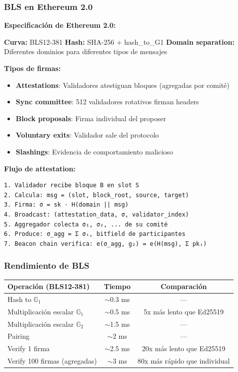 \documentclass[11pt,a4paper,twoside,openright]{book}
\theoremstyle{definition}
\theoremstyle{plain}
\theoremstyle{remark}
\newcommand{\G}{\mathbb{G}}
\begin{document}
\subsubsection{BLS en Ethereum 2.0}

\begin{mathnote}
\textbf{Especificación de Ethereum 2.0:}

\textbf{Curva:} BLS12-381
\textbf{Hash:} SHA-256 + hash\_to\_G1
\textbf{Domain separation:} Diferentes dominios para diferentes tipos de mensajes

\textbf{Tipos de firmas:}
\begin{itemize}
    \item \textbf{Attestations}: Validadores atestiguan bloques (agregadas por comité)
    \item \textbf{Sync committee}: 512 validadores rotativos firman headers
    \item \textbf{Block proposals}: Firma individual del proposer
    \item \textbf{Voluntary exits}: Validador sale del protocolo
    \item \textbf{Slashings}: Evidencia de comportamiento malicioso
\end{itemize}

\textbf{Flujo de attestation:}
\begin{verbatim}
1. Validador recibe bloque B en slot S
2. Calcula: msg = (slot, block_root, source, target)
3. Firma: σ = sk · H(domain || msg)
4. Broadcast: (attestation_data, σ, validator_index)
5. Aggregador colecta σ₁, σ₂, ... de su comité
6. Produce: σ_agg = Σ σᵢ, bitfield de participantes
7. Beacon chain verifica: e(σ_agg, g₂) = e(H(msg), Σ pkᵢ)
\end{verbatim}
\end{mathnote}

\subsubsection{Rendimiento de BLS}

\begin{center}
\begin{tabular}{lcc}
\toprule
\textbf{Operación (BLS12-381)} & \textbf{Tiempo} & \textbf{Comparación} \\
\midrule
Hash to $\G_1$ & $\sim$0.3 ms & --- \\
Multiplicación escalar $\G_1$ & $\sim$0.5 ms & 5x más lento que Ed25519 \\
Multiplicación escalar $\G_2$ & $\sim$1.5 ms & --- \\
Pairing & $\sim$2 ms & --- \\
Verify 1 firma & $\sim$2.5 ms & 20x más lento que Ed25519 \\
Verify 100 firmas (agregadas) & $\sim$3 ms & 80x más rápido que individual \\
\bottomrule
\end{tabular}
\end{center}
\end{document}
